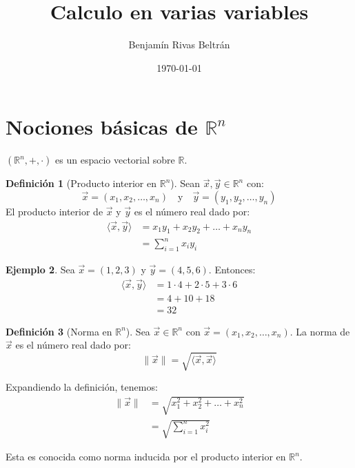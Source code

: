 \documentclass{article}
\title{Calculo en varias variables}
\author{Benjamín Rivas Beltrán}
\date{\today}
\newcommand{\R}{\mathbb{R}}
\newcommand{\vect}[1]{\vec{#1}}
\newcommand{\inner}[2]{\langle #1, #2 \rangle}
\newcommand{\norm}[1]{\| #1 \|}
\theoremstyle{definition}
\newtheorem{definition}{Definición}[section]
\newtheorem{example}[definition]{Ejemplo}
\theoremstyle{plain}
\theoremstyle{remark}
\theoremstyle{corollary}
\begin{document}
\maketitle

\section{Nociones básicas de $\R^n$}

$(\R^n, +, \cdot)$ es un espacio vectorial  sobre $\R$.

\begin{definition}[Producto interior en $\R^n$]

Sean $\vect{x}, \vect{y} \in \R^n$ con:
\[
\vect{x} = (x_1, x_2, \dots, x_n) \quad \text{y} \quad \vect{y} = (y_1, y_2, \dots, y_n) \]
El producto interior de $\vect{x}$ y $\vect{y}$ es el número real dado por:
\begin{align*}
\inner{\vect{x}}{\vect{y}} &= x_1 y_1 + x_2 y_2 + \dots + x_n y_n \\
&= \sum_{i=1}^n x_i y_i
\end{align*}

\end{definition}

\begin{example}

Sea $\vect{x} = (1, 2, 3)$ y $\vect{y} = (4, 5, 6)$. Entonces:
\begin{align*}
\inner{\vect{x}}{\vect{y}} &= 1 \cdot 4 + 2 \cdot 5 + 3 \cdot 6 \\
&= 4 + 10 + 18 \\
&= 32
\end{align*}

\end{example}

\begin{definition}[Norma en $\R^n$]

Sea $\vect{x} \in \R^n$ con $\vect{x} = (x_1, x_2, \dots, x_n)$. La norma de $\vect{x}$ es el número real dado por:
\[
\norm{\vect{x}} = \sqrt{\inner{\vect{x}}{\vect{x}}}
\]

Expandiendo la definición, tenemos:
\begin{align*}
\norm{\vect{x}} &= \sqrt{x_1^2 + x_2^2 + \dots + x_n^2} \\
&= \sqrt{\sum_{i=1}^n x_i^2}
\end{align*}

Esta es conocida como norma inducida por el producto interior en $\R^n$.

\end{definition}
\end{document}
